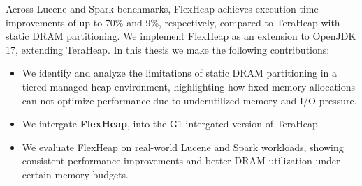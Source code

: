 Across Lucene and Spark benchmarks, FlexHeap achieves 
execution time improvements of up to 70\% and 9\%, respectively, compared to 
TeraHeap with static DRAM partitioning. We implement FlexHeap as an extension 
to OpenJDK 17, extending TeraHeap.
In this thesis we make the following contributions:

\vspace{0.5em}
\begin{itemize}
\item We identify and analyze the limitations of static DRAM partitioning in a tiered managed heap 
  environment, highlighting how fixed memory allocations can not optimize performance 
  due to underutilized memory and I/O pressure.

\item We intergate \textbf{FlexHeap}, into the G1 intergated version of TeraHeap \cite{melidonis_thesis, mairh_thesis}

\item We evaluate FlexHeap on real-world Lucene and Spark workloads, showing consistent
  performance improvements and better DRAM utilization under certain memory budgets.

\end{itemize}
